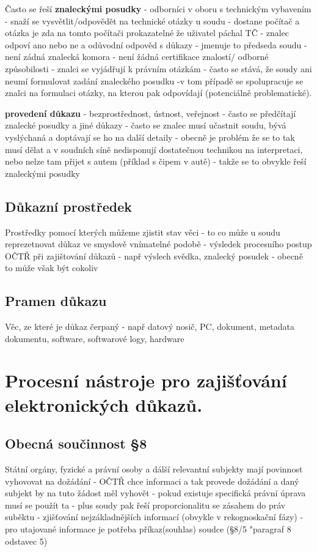 Často se řeší \textbf{znaleckými posudky} - odborníci v oboru s technickým vybavením - snaží se
vysvětlit/odpovědět na technické otázky u soudu - dostane počítač a otázka je zda na tomto počítači
prokazatelné že uživatel páchal TČ - znalec odpoví ano nebo ne a odůvodní odpověd s důkazy -
jmenuje to předseda soudu - není zádná znalecká komora - není žádná certifikace znalostí/
odborné způsobilosti - znalci se vyjádřují k právním otázkám - často se stává, že soudy ani neumí
formulovat zadání znaleckého posudku -v tom případě se spolupracuje se znalci na formulaci
otázky, na kterou pak odpovídají (potenciálně problematické).

\textbf{provedení důkazu }- bezprostřednost, ústnost, veřejnost - často se předčítají znalecké posudky a
jiné důkazy - často se znalec musí učastnit soudu, bývá vyslýchaná a doptávají se ho na další
detaily - obecně je problém že se to tak musí dělat a v soudních síně nedisponují dostatečnou
technikou na interpretaci, nebo nelze tam přijet s autem (příklad s čipem v autě) - takže se to
obvykle řeší znaleckými posudky

\subsection{Důkazní prostředek}
Prostředky pomocí kterých můžeme zjistit stav věci - to co může u
soudu reprezetnovat důkaz ve smyslově vnímatelné podobě - výsledek procesního postup
OČTŘ při zajištování důkazů - např výslech svědka, znalecký posudek - obecně to může však
být cokoliv
\subsection{Pramen důkazu}
Věc, ze které je důkaz čerpaný - např datový nosič, PC, dokument, metadata dokumentu, software, softwarové logy, hardware

\newpage
\section{Procesní nástroje pro zajišťování elektronických důkazů.}

\subsection{Obecná součinnost §8}
Státní orgány, fyzické a právní osoby a dálší relevantní subjekty mají povinnost vyhovovat na
dožádání - OČTŘ chce informaci a tak provede dožádání a daný subjekt by na tuto žádost měl
vyhovět - pokud existuje specifická právní úprava musí se použít ta - plus soudy pak řeší
proporcionalitu se zásahem do práv suběktu - zjišťování nejzákladnějších informací (obvykle v
rekognoskační fázy) - pro utajované informace je potřeba příkaz(souhlas) soudce (§8/5 "paragraf 8
odstavec 5)
